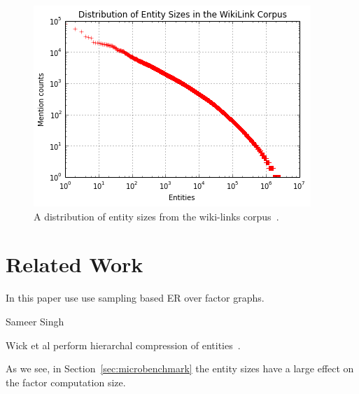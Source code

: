 \begin{figure}
\centering
\includegraphics[width=\columnwidth]{media/entity-distribution.png}
\caption{A distribution of entity sizes from the wiki-links corpus~\cite{singh12:wiki-links}.}
\label{fig:entity-distribution}
\end{figure}





\section{Related Work}

In this paper use use sampling based ER over factor graphs.

Sameer Singh~\cite{singh2011large}

Wick et al perform hierarchal compression of entities~\cite{Wick:2012:DHM:2390524.2390578}.


As we see, in Section~\ref{sec:microbenchmark} the entity sizes have a
large effect on the factor computation size.



